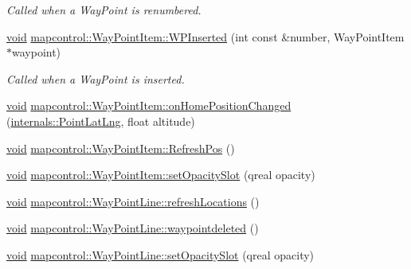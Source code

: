 \begin{DoxyCompactItemize}
\begin{DoxyCompactList}\small\item\em \-Called when a \-Way\-Point is renumbered. \end{DoxyCompactList}\item 
\hyperlink{group___u_a_v_objects_plugin_ga444cf2ff3f0ecbe028adce838d373f5c}{void} \hyperlink{group___o_p_map_widget_ga5a663a828366d996f76a646e2cad90ec}{mapcontrol\-::\-Way\-Point\-Item\-::\-W\-P\-Inserted} (int const \&number, \-Way\-Point\-Item $\ast$waypoint)
\begin{DoxyCompactList}\small\item\em \-Called when a \-Way\-Point is inserted. \end{DoxyCompactList}\item 
\hyperlink{group___u_a_v_objects_plugin_ga444cf2ff3f0ecbe028adce838d373f5c}{void} \hyperlink{group___o_p_map_widget_gaacddad340f4910d2ddbc811183adb83c}{mapcontrol\-::\-Way\-Point\-Item\-::on\-Home\-Position\-Changed} (\hyperlink{structinternals_1_1_point_lat_lng}{internals\-::\-Point\-Lat\-Lng}, float altitude)
\item 
\hyperlink{group___u_a_v_objects_plugin_ga444cf2ff3f0ecbe028adce838d373f5c}{void} \hyperlink{group___o_p_map_widget_ga0fa8c77130a9df8c2057ea0078606e0f}{mapcontrol\-::\-Way\-Point\-Item\-::\-Refresh\-Pos} ()
\item 
\hyperlink{group___u_a_v_objects_plugin_ga444cf2ff3f0ecbe028adce838d373f5c}{void} \hyperlink{group___o_p_map_widget_ga31fd5de287142c02d4bd478b4aacdf52}{mapcontrol\-::\-Way\-Point\-Item\-::set\-Opacity\-Slot} (qreal opacity)
\item 
\hyperlink{group___u_a_v_objects_plugin_ga444cf2ff3f0ecbe028adce838d373f5c}{void} \hyperlink{group___o_p_map_widget_ga172c303dfa7505c919d0a6dab7cb5bc1}{mapcontrol\-::\-Way\-Point\-Line\-::refresh\-Locations} ()
\item 
\hyperlink{group___u_a_v_objects_plugin_ga444cf2ff3f0ecbe028adce838d373f5c}{void} \hyperlink{group___o_p_map_widget_ga507019eb072fcd6904290dadf39a11ef}{mapcontrol\-::\-Way\-Point\-Line\-::waypointdeleted} ()
\item 
\hyperlink{group___u_a_v_objects_plugin_ga444cf2ff3f0ecbe028adce838d373f5c}{void} \hyperlink{group___o_p_map_widget_ga352adc3521d31339f2693ad55de5e1d7}{mapcontrol\-::\-Way\-Point\-Line\-::set\-Opacity\-Slot} (qreal opacity)
\end{DoxyCompactItemize}
